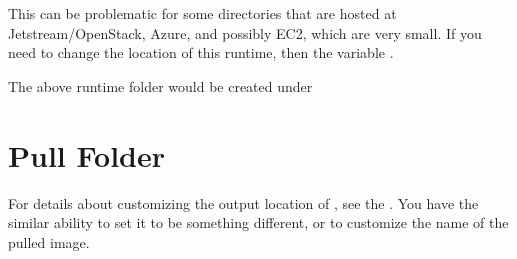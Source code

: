 \documentclass[letterpaper,10pt,english]{sphinxmanual}
\begin{document}
This can be problematic for some  directories that are hosted at
Jetstream/OpenStack, Azure, and possibly EC2, which are very small. If
you need to change the location of this runtime, then  the
variable .

%
\begin{sphinxVerbatim}[commandchars=\\\{\}]

 

   
\end{sphinxVerbatim}

The above runtime folder would be created under 


\section{Pull Folder}
\label{\detokenize{build_environment:pull-folder}}
For details about customizing the output location of , see the
. You have the similar ability to set it to be something
different, or to customize the name of the pulled image.
\end{document}
